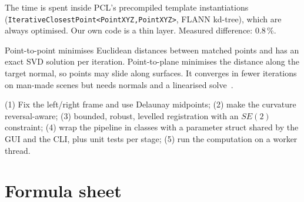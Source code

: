 \documentclass[10pt,a4paper]{scrartcl}
\newcommand{\code}[1]{\texttt{#1}}
\newcommand{\RuleSection}[1]{%
    \section{#1}%
    \vspace{0.2em}{\color{accent!35}\hrule height 0.4pt}\vspace{0.3em}%
  }
\begin{document}
  \begin{askbox}
  \small The time is spent inside PCL's precompiled template instantiations
  (\code{IterativeClosestPoint<PointXYZ,PointXYZ>}, FLANN kd-tree), which are always
  optimised. Our own code is a thin layer. Measured difference: 0.8\,\%.
  \end{askbox}

  \begin{askbox}
  \small Point-to-point minimises Euclidean distances between matched points and has
  an exact SVD solution per iteration. Point-to-plane minimises the distance along the
  target normal, so points may slide along surfaces. It converges in fewer iterations on
  man-made scenes but needs normals and a linearised solve~\citep{chen1992object,rusinkiewicz2001efficient}.
  \end{askbox}

  \begin{askbox}
  \small (1) Fix the left/right frame and use Delaunay midpoints; (2) make the
  curvature reversal-aware; (3) bounded, robust, levelled registration with an
  $SE(2)$ constraint; (4) wrap the pipeline in classes with a parameter struct shared by
  the GUI and the CLI, plus unit tests per stage; (5) run the computation on a worker
  thread.
  \end{askbox}

  \RuleSection{Formula sheet}
  \label{sec:formulas}
\end{document}
